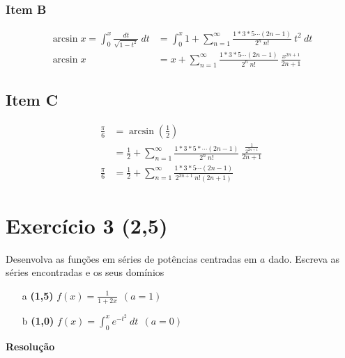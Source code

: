 \documentclass[12pt,openany, letterpaper]{book}
\newcommand{\soma}[2][n]{\sum_{{#1} = #2}^\infty}
\newcommand{\E}[1]{Exercício #1}
\newcommand{\DS}{\displaystyle{}}
\newcommand{\Resolve}{\begin{center} \textbf{Resolução} \end{center}}
\begin{document}
{{\subsubsection*{Item B} \begin{align*}
    \arcsin x = \int_0^x \frac{dt}{\sqrt{1-t^2}}\ dt &= \int_0^x 1 + \soma{1} \frac{1*3*5\cdots(2n-1)}{2^n \ n!} \ t^2 \ dt \\ 
    \arcsin x &= x + \soma{1} \frac{1*3*5\cdots(2n-1)}{2^n \ n!} \ \frac{x^{2n+1}}{2n+1}
\end{align*}

\subsection*{Item C} \begin{align*}
    \frac{\pi}{6} &= \arcsin \left(\frac{1}{2}\right) \\
    &= \frac{1}{2} + \soma{1} \frac{1*3*5*\cdots(2n-1)}{2^n \ n!} \ \frac{\frac{1}{2^{2n+1}}}{2n+1} \\
    \frac{\pi}{6} &= \frac{1}{2} + \soma{1} \frac{1*3*5\cdots(2n-1)}{2^{3n+1} \ n! (2n+1)}
\end{align*}

\newpage

\section*{\E{3} (2,5)}{Desenvolva as funções em séries de potências centradas em $a$ dado. Escreva as séries encontradas e os seus domínios}
\begin{multicols}{2}
    \begin{itemize}
       \item [a] \textbf{(1,5)} $\DS{f(x) = \frac{1}{1+2x} \ \ (a = 1)}$
       \item [b] \textbf{(1,0)} $\DS{f(x) = \int_0^x e^{-t^2} \ dt \ \ (a = 0)}$
    \end{itemize}
\end{multicols}

\Resolve

\begin{multicols}{2}

\end{multicols}}}
\end{document}
